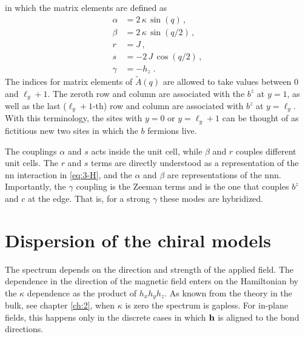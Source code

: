 in which the matrix elements are defined as 
\begin{align}
    \alpha       & = 2\, \kappa  \, \sin(q) \, ,  \\
    \beta        & = 2  \, \kappa  \, \sin(q/2) \, ,  \\
    r               & =   J  \,  ,   \\
    s               & = -2   \, J \, \cos(q/2)   \, , \\  
    \gamma          &   = - h_{z} \;.
\end{align}
The indices for matrix elements of $\tilde{A}(q)$ are allowed to take values between $0$ and $\ell_y+1$. The zeroth row and column are associated with the $b^z$ at $y=1$, as well as the last ($\ell_y+1$-th) row and column are associated with $b^z$ at $y=\ell_y$. With this terminology, the sites with $y=0$ or $y=\ell_y+1$ can be thought of as fictitious new two sites in which the $b$ fermions live.  

The couplings $\alpha$ and $s$ acts inside the unit cell, while $\beta$ and $r$ couples different unit cells. 
The $r$ and $s$ terms are directly understood as a representation of the \acrshort{nn} interaction in \eqref{eq:3-H}, and the $\alpha$ and $\beta$ are representations of the \acrshort{nnn}. Importantly, the $\gamma$ coupling is the Zeeman terms and is the one that couples $b^z$ and $c$ at the edge. That is, for a strong $\gamma$ these modes are hybridized. 

\section{Dispersion of the chiral models}

The spectrum depends on the direction and strength of the applied field. The dependence in the direction of the magnetic field enters on the Hamiltonian by the $\kappa$ dependence as the product of $h_x h_y h_z$. As known from the theory in the bulk, see chapter \ref{ch:2}, when $\kappa$ is zero the spectrum is gapless. For in-plane fields, this happens only in the discrete cases in which $\bf{h}$ is aligned to the bond directions.

